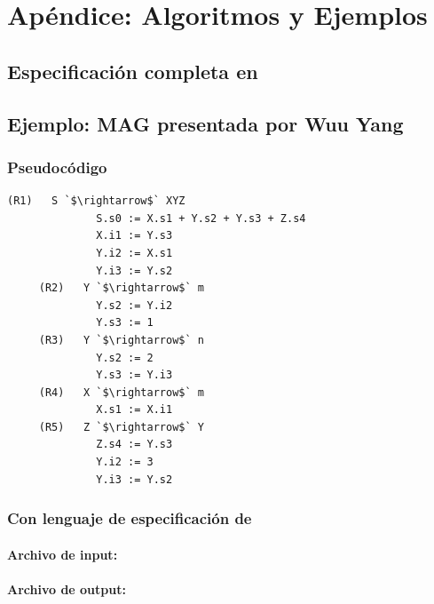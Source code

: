 \chapter{Apéndice: Algoritmos y Ejemplos}
\label{chap:appendix}

\section{Especificación completa en \spirit}
\label{append:grammarspirit}



\section{Ejemplo: MAG presentada por Wuu Yang}
\label{append:agwuuyang}

\subsection{Pseudocódigo}
\begin{lstlisting}[backgroundcolor=\color{white}]
     (R1)   S `$\rightarrow$` XYZ      
              S.s0 := X.s1 + Y.s2 + Y.s3 + Z.s4
              X.i1 := Y.s3  
              Y.i2 := X.s1
              Y.i3 := Y.s2
     (R2)   Y `$\rightarrow$` m        
              Y.s2 := Y.i2
              Y.s3 := 1
     (R3)   Y `$\rightarrow$` n        
              Y.s2 := 2
              Y.s3 := Y.i3
     (R4)   X `$\rightarrow$` m        
              X.s1 := X.i1
     (R5)   Z `$\rightarrow$` Y        
              Z.s4 := Y.s3
              Y.i2 := 3
              Y.i3 := Y.s2
\end{lstlisting} 

\subsection{Con lenguaje de especificación de \maggen}

\subsubsection{Archivo de input: }


\subsubsection{Archivo de output: }


